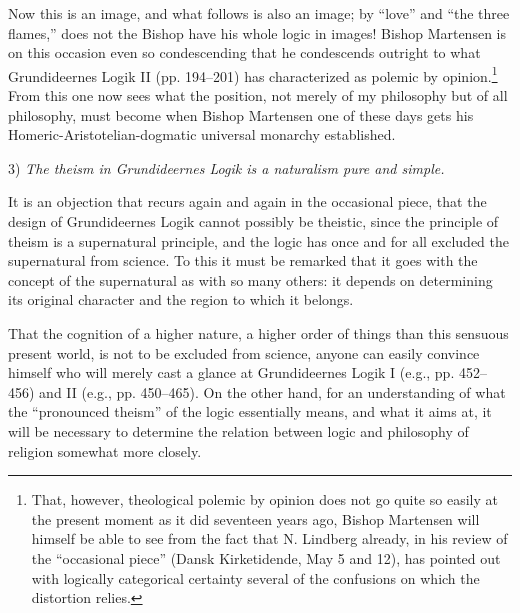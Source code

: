 \documentclass[12pt]{book}
\newcommand{\opage}[1]{\marginnote{\footnotesize\textit{[#1]}}}
\begin{document}
Now this is an image, and what follows is also an image; by ``love'' and ``the three flames,'' does not the Bishop have his whole logic in images! Bishop Martensen is on this occasion even so condescending that he condescends outright to what Grundideernes Logik II (pp. 194--201) has characterized as polemic by opinion.\footnote{That, however, theological polemic by opinion does not go quite so easily at the present moment as it did seventeen years ago, Bishop Martensen will himself be able to see from the fact that N. Lindberg already, in his review of the ``occasional piece'' (Dansk Kirketidende, May 5 and 12), has pointed out with logically categorical certainty several of the confusions on which the distortion relies.}
\opage{133}\setcounter{footnote}{0}%
From this one now sees what the position, not merely of my philosophy but of all philosophy, must become when Bishop Martensen one of these days gets his Homeric-Aristotelian-dogmatic universal monarchy established.

3) \emph{The theism in Grundideernes Logik is a naturalism pure and simple.}

It is an objection that recurs again and again in the occasional piece, that the design of Grundideernes Logik cannot possibly be theistic, since the principle of theism is a supernatural principle, and the logic has once and for all excluded the supernatural from science. To this it must be remarked that it goes with the concept of the supernatural as with so many others: it depends on determining its original character and the region to which it belongs.

That the cognition of a higher nature, a higher order of things than this sensuous present world, is not to be excluded from science, anyone can easily convince himself who will merely cast a glance at Grundideernes Logik I (e.g., pp. 452--456) and II (e.g., pp. 450--465). On the other hand, for an understanding of what the ``pronounced theism'' of the logic essentially means, and what it aims at, it will be necessary to determine the relation between logic and philosophy of religion somewhat more closely.
\end{document}
